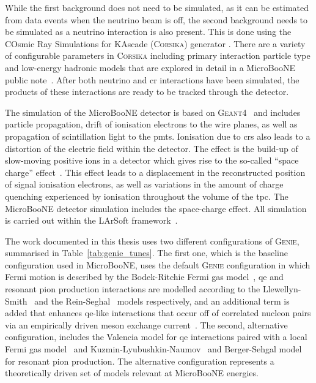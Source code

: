 While the first background does not need to be simulated, as it can be estimated from data events when the neutrino beam is off, the second background needs to be simulated as a neutrino interaction is also present.
This is done using the COsmic Ray Simulations for KAscade (\textsc{Corsika}) generator \cite{corsika}. There are a variety of configurable parameters in \textsc{Corsika} including primary interaction particle type and low-energy hadronic models that are explored in detail in a MicroBooNE public note~\cite{corsika_note}. 
After both neutrino and \acrshort{cr} interactions have been simulated, the products of these interactions are ready to be tracked through the detector.

The simulation of the MicroBooNE detector is based on \textsc{Geant4}~\cite{geant} and includes particle propagation, drift of ionisation electrons to the wire planes, as well as propagation of scintillation light to the \acrshort{pmt}s.
Ionisation due to \acrshort{cr}s also leads to a distortion of the electric field within the detector. The effect is the build-up of slow-moving positive ions in a detector which gives rise to the so-called ``space charge'' effect~\cite{space_charge}. This effect leads to a displacement in the reconstructed position of signal ionisation electrons, as well as variations in the amount of charge quenching experienced by ionisation throughout the volume of the \acrshort{tpc}. The MicroBooNE detector simulation includes the space-charge effect.
All simulation is carried out within the LArSoft framework~\cite{larsoft}.

The work documented in this thesis uses two different configurations of \textsc{Genie}, summarised in Table~\ref{tab:genie_tunes}. The first one, which is the baseline configuration used in MicroBooNE, uses the default \textsc{Genie} configuration in which Fermi motion is described by the Bodek-Ritchie Fermi gas model~\cite{bodek_ritchie}, \acrshort{qe} and resonant pion production interactions are modelled according to the Llewellyn-Smith~\cite{llewellyn} and the Rein-Seghal~\cite{rein_sehgal} models respectively, and an additional term is added that enhances \acrshort{qe}-like interactions that occur off of correlated nucleon pairs via an empirically driven meson exchange current~\cite{mec_dytman}. The second, alternative configuration, includes the Valencia model for \acrshort{qe} interactions paired with a local Fermi gas model~\cite{nieves, nieves2} and Kuzmin-Lyubushkin-Naumov~\cite{kuzmin} and Berger-Sehgal model~\cite{berger_sehgal} for resonant pion production. The alternative configuration represents a theoretically driven set of models relevant at MicroBooNE energies.

